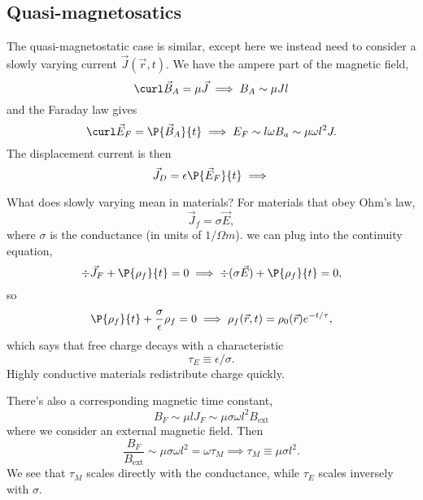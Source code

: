 \subsection*{Quasi-magnetosatics}
The quasi-magnetostatic case is similar, except here we instead need to consider a slowly varying current $\vec J(\vec r, t)$. We have the ampere part of the magnetic field,
\begin{equation}
    \curl \vec B_A = \mu \vec J \implies B_A \sim \mu Jl
\end{equation}
and the Faraday law gives
\begin{equation}
    \curl \vec E_F = \P{\vec B_A}{t} \implies E_F \sim l \omega B_a \sim \mu \omega l^2 J.
\end{equation}
The displacement current is then
\begin{equation}
    \vec J_D  =\epsilon \P{\vec E_F}{t} \implies 
\end{equation}

What does slowly varying mean in materials? For materials that obey Ohm's law,
\begin{equation}
    \vec J_f = \sigma \vec E,
\end{equation}
where $\sigma$ is the conductance (in units of $1/\Omega m$). we can plug into the continuity equation,
\begin{equation}
    \div \vec J_F + \P{\rho_f}{t} =0 \implies \div (\sigma \vec E) + \P{\rho_f}{t}=0,
\end{equation}
so
\begin{equation}
    \P{\rho_f}{t} + \frac{\sigma}{\epsilon} \rho_f =0 \implies \rho_f(\vec r,t) = \rho_0(\vec r) e^{-t/\tau},
\end{equation}
which says that free charge decays with a characteristic 
\begin{equation}
    \tau_E \equiv \epsilon/\sigma.
\end{equation}
Highly conductive materials redistribute charge quickly.

There's also a corresponding magnetic time constant,
\begin{equation}
    B_F \sim \mu l J_F \sim \mu \sigma \omega l^2 B_\text{ext}
\end{equation}
where we consider an external magnetic field. Then
\begin{equation}
    \frac{B_F}{B_\text{ext}} \sim \mu \sigma \omega l^2 = \omega \tau_M \implies \tau_M \equiv \mu \sigma l^2.
\end{equation}
We see that $\tau_M$ scales directly with the conductance, while $\tau_E$ scales inversely with $\sigma$.

